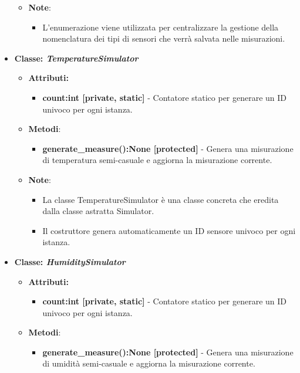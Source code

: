 \begin{itemize}
\begin{itemize}
            \item \textbf{Note}:
            \begin{itemize}
                \item L'enumerazione viene utilizzata per centralizzare la gestione della nomenclatura dei tipi di sensori che verrà salvata nelle misurazioni.
            \end{itemize}
        \end{itemize}
        
        
    \item{\textbf{Classe: \textit{TemperatureSimulator}}}
    \begin{itemize}
        \item \textbf{Attributi:}
    \begin{itemize}
        \item \textbf{count:int [private, static]} - Contatore statico per generare un ID univoco per ogni istanza.
    \end{itemize}
    \item\textbf{Metodi}: 
    \begin{itemize}
        \item \textbf{generate\_measure():None [protected]} - Genera una misurazione di temperatura semi-casuale e aggiorna la misurazione corrente.
    \end{itemize}
    \item\textbf{Note}:
    \begin{itemize}
        \item La classe TemperatureSimulator è una classe concreta che eredita dalla classe astratta Simulator.
        \item Il costruttore genera automaticamente un ID sensore univoco per ogni istanza.
    \end{itemize}
\end{itemize}
    \item{\textbf{Classe: \textit{HumiditySimulator}}}
    \begin{itemize}
        \item\textbf{Attributi:}
    \begin{itemize}
        \item \textbf{count:int [private, static]} - Contatore statico per generare un ID univoco per ogni istanza.
    \end{itemize}
    \item \textbf{Metodi}: 
    \begin{itemize}
        \item \textbf{generate\_measure():None [protected]} - Genera una misurazione di umidità semi-casuale e aggiorna la misurazione corrente.

\end{itemize}
\end{itemize}
\end{itemize}
